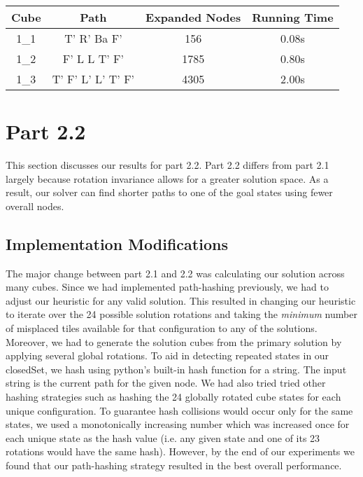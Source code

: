 \documentclass{article}
\begin{document}
\begin{center}
\begin{tabular}{|c|c|c|c|}
\hline\textbf{Cube} & \textbf{Path} & \textbf{Expanded Nodes} & \textbf{Running Time} \\
\hline\hline 1\_1 & T' R' Ba F' & 156 & 0.08s \\
\hline 1\_2 & F' L L T' F' & 1785 & 0.80s \\
\hline 1\_3 & T' F' L' L' T' F' & 4305 & 2.00s \\
\hline
\end{tabular}
\end{center}

\section{Part 2.2}

This section discusses our results for part 2.2. Part 2.2 differs from part 2.1 largely because rotation invariance allows for a greater solution space. As a result, our solver can find shorter paths to one of the goal states using fewer overall nodes.

\subsection{Implementation Modifications}

The major change between part 2.1 and 2.2 was calculating our solution across many cubes. Since we had implemented path-hashing previously, we had to adjust our heuristic for any valid solution. This resulted in changing our heuristic to iterate over the 24 possible solution rotations and taking the \emph{minimum} number of misplaced tiles available for that configuration to any of the solutions. Moreover, we had to generate the solution cubes from the primary solution by applying several global rotations. To aid in detecting repeated states in our closedSet, we hash using python's built-in hash function for a string. The input string is the current path for the given node. We had also tried tried other hashing strategies such as hashing the 24 globally rotated cube states for each unique configuration. To guarantee hash collisions would occur only for the same states, we used a monotonically increasing number which was increased once for each unique state as the hash value (i.e. any given state and one of its 23 rotations would have the same hash). However, by the end of our experiments we found that our path-hashing strategy resulted in the best overall performance.
\end{document}
